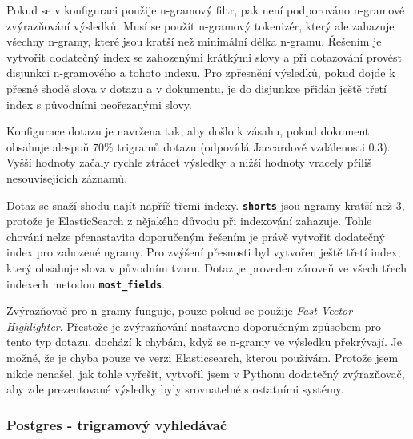 \documentclass[11pt,letterpaper,oneside,openright]{book}
\newcommand{\bftt}[1]{\texttt{\textbf{#1}}}
\begin{document}
Pokud se v konfiguraci použije n-gramový filtr, pak není podporováno n-gramové
zvýrazňování výsledků. Musí se použít n-gramový tokenizér, který ale zahazuje
všechny n-gramy, které jsou kratší než minimální délka n-gramu. Řešením je
vytvořit dodatečný index se zahozenými krátkými slovy a při dotazování provést
disjunkci n-gramového a tohoto indexu. Pro zpřesnění výsledků, pokud dojde k
přesné shodě slova v dotazu a v dokumentu, je do disjunkce přidán ještě třetí
index s původními neořezanými slovy.

Konfigurace dotazu je navržena tak, aby došlo k zásahu, pokud dokument obsahuje
alespoň $70\%$ trigramů dotazu (odpovídá Jaccardově vzdálenosti $0.3$). Vyšší
hodnoty začaly rychle ztrácet výsledky a nižší hodnoty vracely příliš
nesouvisejících záznamů.

Dotaz se snaží shodu najít napříč třemi indexy. \bftt{shorts} jsou ngramy
kratší než $3$, protože je ElasticSearch z nějakého důvodu při indexování
zahazuje. Tohle chování nelze přenastavita doporučeným řešením je právě
vytvořit dodatečný index pro zahozené ngramy. Pro zvýšení přesnosti byl
vytvořen ještě třetí index, který obsahuje slova v původním tvaru. Dotaz je
proveden zároveň ve všech třech indexech metodou \bftt{most\_fields}.

Zvýrazňovač pro n-gramy funguje, pouze pokud se použije \textit{Fast Vector
Highlighter}. Přestože je zvýrazňování nastaveno doporučeným způsobem pro tento
typ dotazu, dochází k chybám, když se n-gramy ve výsledku překrývají. Je možné,
že je chyba pouze ve verzi Elasticsearch, kterou používám. Protože jsem nikde
nenašel, jak tohle vyřešit, vytvořil jsem v Pythonu dodatečný zvýrazňovač, aby
zde prezentované výsledky byly srovnatelné s ostatními systémy.

\subsubsection{Postgres - trigramový vyhledávač}


\end{document}
